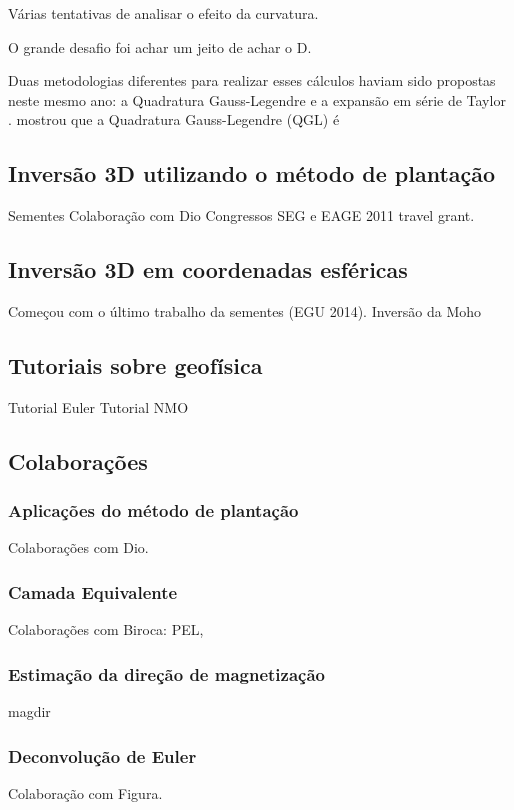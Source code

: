 Várias tentativas de analisar o efeito da curvatura.

O grande desafio foi achar um jeito de achar o D.


Duas metodologias diferentes para realizar esses cálculos haviam sido propostas
neste mesmo ano: a Quadratura Gauss-Legendre \citep{asgharzadeh2007}
e a expansão em série de Taylor \citep{heck2007}.
\citet{wild-pfeiffer2008} mostrou que a Quadratura Gauss-Legendre (QGL) é



\subsection{Inversão 3D utilizando o método de plantação}

Sementes
Colaboração com Dio
Congressos
SEG e EAGE 2011 travel grant.


\subsection{Inversão 3D em coordenadas esféricas}


Começou com o último trabalho da sementes (EGU 2014).
Inversão da Moho


\subsection{Tutoriais sobre geofísica}

Tutorial Euler
Tutorial NMO


\subsection{Colaborações}


\subsubsection{Aplicações do método de plantação}

Colaborações com Dio.


\subsubsection{Camada Equivalente}

Colaborações com Biroca: PEL,


\subsubsection{Estimação da direção de magnetização}

magdir


\subsubsection{Deconvolução de Euler}

Colaboração com Figura.
